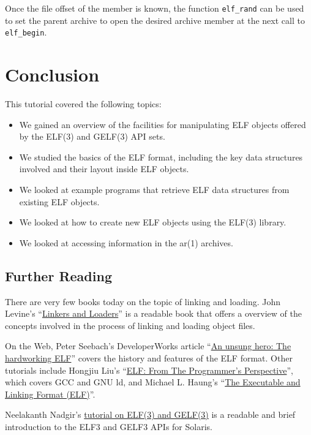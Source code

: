 \documentclass[a4paper,pdftex]{book}
\newcommand{\function}[1]{\texttt{#1}}
\newcommand{\trade}{\texttrademark\xspace}
\begin{document}
Once the file offset of the member is known, the function
\function{elf\_rand} can be used to set the parent archive to open the
desired archive member at the next call to \function{elf\_begin}.%
\index{ar~archive!random~access!use of \function{elf\_rand}}

\chapter{Conclusion}\label{chap.conclusion}

This tutorial covered the following topics:
\begin{itemize}
\item We gained an overview of the facilities for manipulating ELF
  objects offered by the ELF(3) and GELF(3) API sets.
\item We studied the basics of the ELF format, including the key data
  structures involved and their layout inside ELF objects.
\item We looked at example programs that retrieve ELF data structures
  from existing ELF objects.
\item We looked at how to create new ELF objects using the ELF(3)
  library.
\item We looked at accessing information in the ar(1) archives.
\end{itemize}

\section{Further Reading}

There are very few books today on the topic of linking and loading.
John Levine's ``\href{http://linker.iecc.com/}{Linkers and Loaders}''
is a readable book that offers a overview of the concepts involved in
the process of linking and loading object files.

On the Web, Peter Seebach's DeveloperWorks article
``\href{http://www-128.ibm.com/developerworks/power/library/pa-spec12/index.html}{An
  unsung hero: The hardworking ELF}'' covers the history and features
of the ELF format.  Other tutorials include Hongjiu Liu's
``\href{http://linux4u.jinr.ru/usoft/WWW/www_debian.org/Documentation/elf/elf.html}{ELF:
  From The Programmer's Perspective}'', which covers GCC and GNU ld,
and Michael L. Haung's
``\href{http://www.cs.ucdavis.edu/~haungs/paper/node10.html}{The
  Executable and Linking Format (ELF)}''.

Neelakanth Nadgir's
\href{http://developers.sun.com/solaris/articles/elf.html}
{tutorial on ELF(3) and GELF(3)} is a readable and brief introduction
to the ELF{3} and GELF{3} APIs for Solaris\trade.
\end{document}
